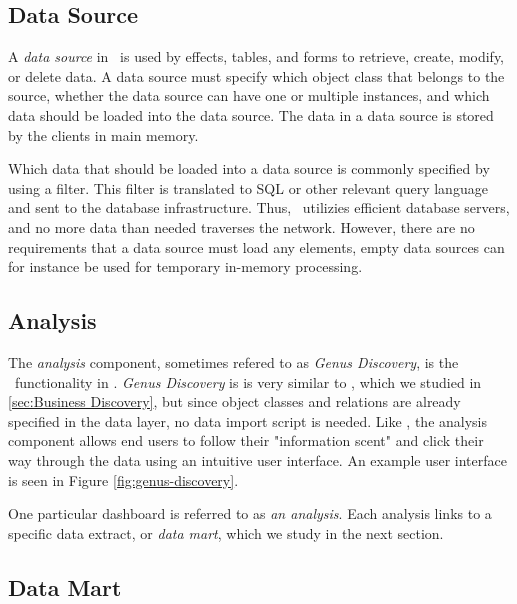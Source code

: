 \subsection{Data Source}
\label{sub:Data Source}


A \textit{data source} in \gap~is used by effects, tables, and forms to retrieve, create, modify, or delete data. A data source must specify which object class that belongs to the source, whether the data source can have one or multiple instances, and which data should be loaded into the data source. The data in a data source is stored by the clients in main memory. 

Which data that should be loaded into a data source is commonly specified by using a filter. This filter is translated to SQL or other relevant query language and sent to the database infrastructure. Thus, \gap~utilizies efficient database servers, and no more data than needed traverses the network. However, there are no requirements that a data source must load any elements, empty data sources can for instance be used for temporary in-memory processing. 

\subsection{Analysis}
\label{sub:Analysis}
The \textit{analysis} component, sometimes refered to as \textit{Genus Discovery}, is the \bd~functionality in \gap. \textit{Genus Discovery} is is very similar to \qlikview, which we studied in \ref{sec:Business Discovery}, but since object classes and relations are already specified in the data layer, no data import script is needed. Like \qlikview, the analysis component allows end users to follow their "information scent" and click their way through the data using an intuitive user interface. An example user interface is seen in Figure \ref{fig:genus-discovery}.

One particular dashboard is referred to as \textit{an analysis}. Each analysis links to a specific data extract, or \textit{data mart}, which we study in the next section.

\subsection{Data Mart}
\label{sub:Data Mart}

